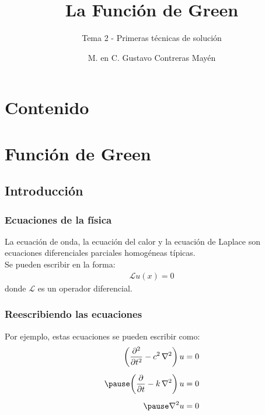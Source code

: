 \documentclass[12pt]{beamer}
\date{}
\title{\large{La Función de Green}}
\subtitle{Tema 2 - Primeras técnicas de solución}
\author{M. en C. Gustavo Contreras Mayén}
\begin{document}
\maketitle
\fontsize{14}{14}\selectfont
{}

\section*{Contenido}

\section{Función de Green}
\subsection{Introducción}

\begin{frame}
\frametitle{Ecuaciones de la física}
La ecuación de onda, la ecuación del calor y la ecuación de Laplace son ecuaciones diferenciales parciales homogéneas típicas.
\\
\bigskip
\pause
Se pueden escribir en la forma:
\pause
\begin{align*}
\mathcal{L} u (x) = 0
\end{align*}
donde $\mathcal{L}$ es un operador diferencial.
\end{frame}
\begin{frame}
\frametitle{Reescribiendo las ecuaciones}
Por ejemplo, estas ecuaciones se pueden escribir como:
\pause
\begin{eqnarray*}
\begin{aligned}
\bigg( \pdv[2]{t} - c^{2} \, \laplacian \bigg) \, u &= 0 \\[0.5em] \pause
\bigg( \pdv{t} - k \, \laplacian \bigg) \, u &= 0 \\[0.5em] \pause
\laplacian{u} &= 0
\end{aligned}
\end{eqnarray*}
\end{frame}
\end{document}
